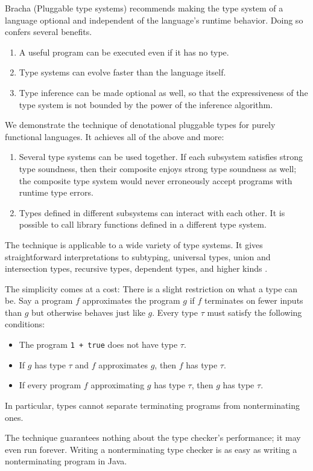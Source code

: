 \documentclass{amsart}
\def\thingsExpressibleInMpsModel{%
subtyping, universal types, union and intersection types,
recursive types, dependent types, and higher kinds%
}
\begin{document}
Bracha (Pluggable type systems) recommends making the type system
of a language optional and independent of the language's runtime
behavior. Doing so confers several benefits.
\begin{enumerate}
\item A useful program can be executed even if it has no type.
\item Type systems can evolve faster than the language itself.
\item Type inference can be made optional as well, so that the
expressiveness of the type system is not bounded by the power of
the inference algorithm.
\end{enumerate}
We demonstrate the technique of denotational pluggable types for
purely functional languages. It achieves all of the above and
more:
\begin{enumerate}\setcounter{enumi}3
\item Several type systems can be used together. If each
subsystem satisfies strong type soundness, then their composite
enjoys strong type soundness as well; the composite type system
would never erroneously accept programs with runtime type errors.
\item Types defined in different subsystems can interact with
each other. It is possible to call library functions defined
in a different type system.
\end{enumerate}
The technique is applicable to a wide variety of type systems. It
gives straightforward interpretations to \thingsExpressibleInMpsModel.

The simplicity comes at a cost: There is a slight restriction on
what a type can be. Say a program $f$ approximates the program
$g$ if $f$ terminates on fewer inputs than $g$ but otherwise
behaves just like $g$. Every type $\tau$ must satisfy the
following conditions:
\begin{itemize}
\item The program \texttt{1 + true} does not have type $\tau$.
\item If $g$ has type $\tau$ and $f$ approximates $g$, then $f$
has type $\tau$.
\item If every program $f$ approximating $g$ has type $\tau$,
then $g$ has type $\tau$.
\end{itemize}
In particular, types cannot separate terminating programs from
nonterminating ones.

The technique guarantees nothing about the type checker's
performance; it may even run forever. Writing a nonterminating
type checker is as easy as writing a nonterminating program in
Java.
\end{document}
